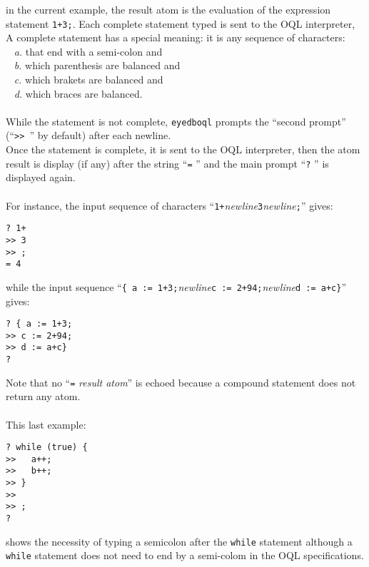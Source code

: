 in the current example, the result atom is the evaluation of the expression
statement \texttt{1+3;}.
Each complete statement typed is sent to the OQL interpreter,
A complete statement has a special meaning: it is any sequence of characters:\\
\mbox{ } \emph{a.} that end with a semi-colon and\\
\mbox{ } \emph{b.} which parenthesis are balanced and\\
\mbox{ } \emph{c.} which brakets are balanced and\\
\mbox{ } \emph{d.} which braces are balanced.\\
\\
While the statement is not complete, \texttt{eyedboql} prompts the
``second prompt'' (``\texttt{>> }'' by default) after each newline.\\
Once the statement is complete, it is sent to the OQL interpreter, then
the atom result is display (if any) after the string ``\texttt{=} ''
and the main prompt ``\texttt{?} '' is displayed again.\\\\
For instance, the input sequence of characters
``\texttt{1+}\emph{newline}\texttt{3}\emph{newline}\texttt{;}'' gives:
\verbsize
\begin{verbatim}
? 1+
>> 3
>> ;
= 4
\end{verbatim}
\normalsize
while the input sequence ``\texttt{\{ a := 1+3;}\emph{newline}\texttt{c := 2+94;}\emph{newline}\texttt{d := a+c\}}'' gives:
\verbsize
\begin{verbatim}
? { a := 1+3;
>> c := 2+94;
>> d := a+c}
?
\end{verbatim}
\normalsize
Note that no ``\texttt{=} \emph{result atom}'' is echoed because a compound
statement does not return any atom.
\\
\\
This last example:
\verbsize
\begin{verbatim}
? while (true) {
>>   a++;
>>   b++;
>> }
>>
>> ;
?
\end{verbatim}
\normalsize
shows the necessity of typing a semicolon after the \texttt{while} statement
although a \texttt{while} statement does not need to end by a semi-colom
in the OQL specifications.

